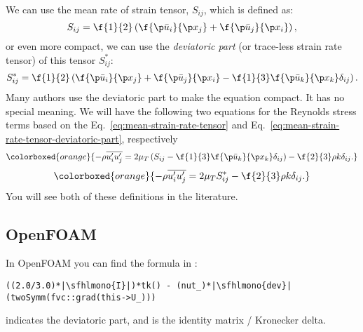 We can use the mean rate of strain tensor, \(S_{ij}\), which is defined as:
%
\begin{equation}
  S_{ij} = \f{1}{2} \left( \f{\p \bar{u}_i}{\p x_j} + \f{\p \bar{u}_j}{\p x_i} \right),
  \label{eq:mean-strain-rate-tensor}
\end{equation}
%
or even more compact, we can use the \emph{deviatoric part} (or trace-less strain rate tensor) of this tensor \(S^*_{ij}\):
%
\begin{equation}
  S^*_{ij}
  = \f{1}{2}
  \left(
    \f{\p \bar{u}_i}{\p x_j}
    + \f{\p \bar{u}_j}{\p x_i}
    - \f{1}{3} \f{\p \bar{u}_k}{\p x_k} \delta_{ij}
  \right).
  \label{eq:mean-strain-rate-tensor-deviatoric-part}
\end{equation}
%
Many authors use the deviatoric part to make the equation compact.
It has no special meaning.
We will have the following two equations for the Reynolds stress terms based on the Eq.~\ref{eq:mean-strain-rate-tensor} and Eq.~\ref{eq:mean-strain-rate-tensor-deviatoric-part}, respectively
%
\begin{equation}
  \colorboxed{orange}{
    -\rho \overline{u^\prime_i u^\prime_j}
    =
    2 \mu_T \left(S_{ij} - \f{1}{3} \f{\p \bar{u}_k}{\p x_k} \delta_{ij} \right)
    - \f{2}{3} \rho k \delta_{ij}.
  }
  \label{eq:reynolds-stress-term-with-strain-rate-tensor}
\end{equation}
%
\begin{equation}
  \colorboxed{orange}{
    -\rho \overline{u^\prime_i u^\prime_j}
    =
    2 \mu_T S^*_{ij}
    - \f{2}{3} \rho k \delta_{ij}.
  }
  \label{eq:reynolds-stress-term-with-strain-rate-tensor-deviatoric-part}
\end{equation}
%
You will see both of these definitions in the literature.


\subsection{OpenFOAM}

In OpenFOAM you can find the formula in :
%
\begin{verbatim}
((2.0/3.0)*|\sfhlmono{I}|)*tk() - (nut_)*|\sfhlmono{dev}|(twoSymm(fvc::grad(this->U_)))
\end{verbatim}
%
 indicates the deviatoric part, and  is the identity matrix / Kronecker delta.


